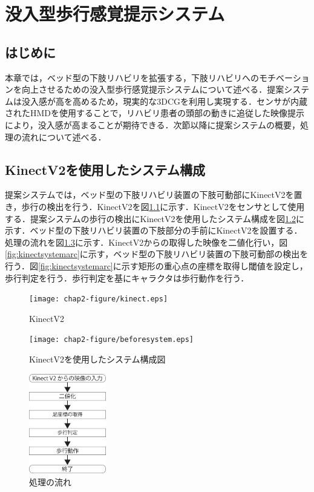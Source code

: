 \chapter{没入型歩行感覚提示システム}

\thispagestyle{myheadings}

\section{はじめに}
本章では，ベッド型の下肢リハビリを拡張する，下肢リハビリへのモチベーションを向上させるための没入型歩行感覚提示システムについて述べる．提案システムは没入感が高を高めるため，現実的な3DCGを利用し実現する．センサが内蔵されたHMDを使用することで，リハビリ患者の頭部の動きに追従した映像提示により，没入感が高まることが期待できる．次節以降に提案システムの概要，処理の流れについて述べる．

\section{KinectV2を使用したシステム構成}
提案システムでは，ベッド型の下肢リハビリ装置の下肢可動部にKinectV2\cite{KinectV2}を置き，歩行の検出を行う．KinectV2を図\ref{fig:kinect}に示す．KinectV2をセンサとして使用する．提案システムの歩行の検出にKinectV2を使用したシステム構成を図\ref{fig:beforesystemarc}に示す．ベッド型の下肢リハビリ装置の下肢部分の手前にKinectV2を設置する．処理の流れを図\ref{fig:片桐1}に示す．KinectV2からの取得した映像を二値化行い，図\ref{fig:kinectsystemarc}に示す，ベッド型の下肢リハビリ装置の下肢可動部の検出を行う．図\ref{fig:kinectsystemarc}に示す矩形の重心点の座標を取得し閾値を設定し，歩行判定を行う．歩行判定を基にキャラクタは歩行動作を行う．

\begin{figure}[tbp]
	\centering
			\texttt{[image: chap2-figure/kinect.eps]}
	\caption{KinectV2}
	\label{fig:kinect}
\end{figure}

\begin{figure}[tbp]
	\centering
			\texttt{[image: chap2-figure/beforesystem.eps]}
	\caption{KinectV2を使用したシステム構成図}
	\label{fig:beforesystemarc}
\end{figure}

\begin{figure}[tbp]
	\centering
			\includegraphics[width=0.3\textwidth]{chap2-figure/katagiri1.eps}
	\caption{処理の流れ}
	\label{fig:片桐1}
\end{figure}

